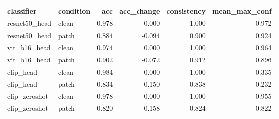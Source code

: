 \begin{tabular}{llrrrr}
\toprule
classifier & condition & acc & acc_change & consistency & mean_max_conf \\
\midrule
resnet50_head & clean & 0.978 & 0.000 & 1.000 & 0.972 \\
resnet50_head & patch & 0.884 & -0.094 & 0.900 & 0.924 \\
vit_b16_head & clean & 0.974 & 0.000 & 1.000 & 0.964 \\
vit_b16_head & patch & 0.902 & -0.072 & 0.912 & 0.896 \\
clip_head & clean & 0.984 & 0.000 & 1.000 & 0.335 \\
clip_head & patch & 0.834 & -0.150 & 0.838 & 0.232 \\
clip_zeroshot & clean & 0.978 & 0.000 & 1.000 & 0.955 \\
clip_zeroshot & patch & 0.820 & -0.158 & 0.824 & 0.822 \\
\bottomrule
\end{tabular}
